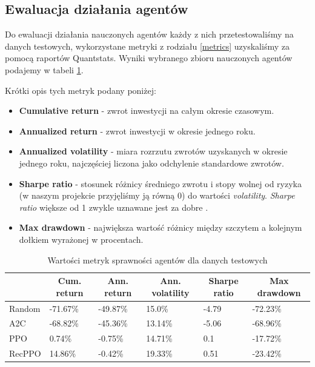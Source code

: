 \documentclass[12pt,a4paper]{article}
\begin{document}
\pagebreak
\subsection{Ewaluacja działania agentów}

Do ewaluacji działania nauczonych agentów każdy z nich przetestowaliśmy
na danych testowych, wykorzystane metryki z rodziału \ref{metrics}
uzyskaliśmy za pomocą raportów Quantstats. Wyniki wybranego zbioru
nauczonych agentów podajemy w tabeli \ref{tab:results}.

Krótki opis tych metryk podany poniżej:

\begin{itemize}
  \item \textbf{Cumulative return} - zwrot inwestycji na całym okresie czasowym.
  \item \textbf{Annualized return} - zwrot inwestycji w okresie jednego roku.
  \item \textbf{Annualized volatility} - miara rozrzutu zwrotów uzyskanych w
        okresie jednego roku, najczęściej liczona jako odchylenie standardowe
        zwrotów.
  \item \textbf{Sharpe ratio} - stosunek różnicy średniego zwrotu i
        stopy wolnej od ryzyka (w naszym projekcie przyjęliśmy ją równą 0)
        do wartości \emph{volatility}. \emph{Sharpe ratio} większe od 1
        zwykle uznawane jest za dobre \cite{sharpe}.
  \item \textbf{Max drawdown} - największa wartość różnicy między
        szczytem a kolejnym dołkiem wyrażonej w procentach.
\end{itemize}

\begin{table}[!h]
  \hspace*{-1cm}\begin{tabular}{llllll}
    \hline
    \multicolumn{1}{c}{} & \multicolumn{1}{c}{Cum. return} & \multicolumn{1}{c}{Ann. return} & \multicolumn{1}{c}{Ann. volatility} & \multicolumn{1}{c}{Sharpe ratio} & \multicolumn{1}{c}{Max drawdown} \\
    \hline
    Random               & -71.67\%                        & -49.87\%                        & 15.0\%                              & -4.79                            & -72.23\%                         \\
    A2C                  & -68.82\%                        & -45.36\%                        & 13.14\%                             & -5.06                            & -68.96\%                         \\
    PPO                  & \phantom{-}0.74\%               & -0.75\%                         & 14.71\%                             & \phantom{-}0.1                   & -17.72\%                         \\
    RecPPO               & \phantom{-}14.86\%              & -0.42\%                         & 19.33\%                             & \phantom{-}0.51                  & -23.42\%                         \\
    \hline
  \end{tabular}
  \caption{Wartości metryk sprawności agentów dla danych testowych}
  \label{tab:results}
\end{table}
\end{document}
